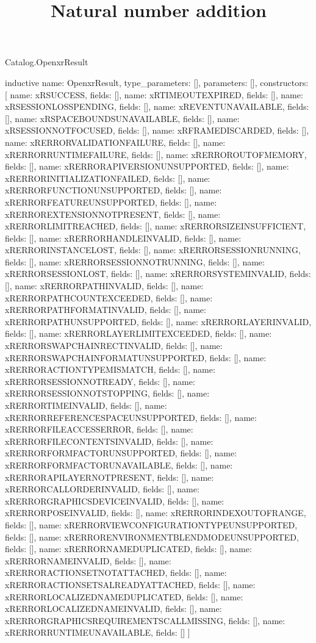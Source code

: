\begin{lexlean}{Catalog.OpenxrResult}
\title{Natural number addition}
\begin{semanticmodule}
inductive{
  name: OpenxrResult,
  type_parameters: [],
  parameters: [],
  constructors: [
    {name: xRSUCCESS, fields: []},
    {name: xRTIMEOUTEXPIRED, fields: []},
    {name: xRSESSIONLOSSPENDING, fields: []},
    {name: xREVENTUNAVAILABLE, fields: []},
    {name: xRSPACEBOUNDSUNAVAILABLE, fields: []},
    {name: xRSESSIONNOTFOCUSED, fields: []},
    {name: xRFRAMEDISCARDED, fields: []},
    {name: xRERRORVALIDATIONFAILURE, fields: []},
    {name: xRERRORRUNTIMEFAILURE, fields: []},
    {name: xRERROROUTOFMEMORY, fields: []},
    {name: xRERRORAPIVERSIONUNSUPPORTED, fields: []},
    {name: xRERRORINITIALIZATIONFAILED, fields: []},
    {name: xRERRORFUNCTIONUNSUPPORTED, fields: []},
    {name: xRERRORFEATUREUNSUPPORTED, fields: []},
    {name: xRERROREXTENSIONNOTPRESENT, fields: []},
    {name: xRERRORLIMITREACHED, fields: []},
    {name: xRERRORSIZEINSUFFICIENT, fields: []},
    {name: xRERRORHANDLEINVALID, fields: []},
    {name: xRERRORINSTANCELOST, fields: []},
    {name: xRERRORSESSIONRUNNING, fields: []},
    {name: xRERRORSESSIONNOTRUNNING, fields: []},
    {name: xRERRORSESSIONLOST, fields: []},
    {name: xRERRORSYSTEMINVALID, fields: []},
    {name: xRERRORPATHINVALID, fields: []},
    {name: xRERRORPATHCOUNTEXCEEDED, fields: []},
    {name: xRERRORPATHFORMATINVALID, fields: []},
    {name: xRERRORPATHUNSUPPORTED, fields: []},
    {name: xRERRORLAYERINVALID, fields: []},
    {name: xRERRORLAYERLIMITEXCEEDED, fields: []},
    {name: xRERRORSWAPCHAINRECTINVALID, fields: []},
    {name: xRERRORSWAPCHAINFORMATUNSUPPORTED, fields: []},
    {name: xRERRORACTIONTYPEMISMATCH, fields: []},
    {name: xRERRORSESSIONNOTREADY, fields: []},
    {name: xRERRORSESSIONNOTSTOPPING, fields: []},
    {name: xRERRORTIMEINVALID, fields: []},
    {name: xRERRORREFERENCESPACEUNSUPPORTED, fields: []},
    {name: xRERRORFILEACCESSERROR, fields: []},
    {name: xRERRORFILECONTENTSINVALID, fields: []},
    {name: xRERRORFORMFACTORUNSUPPORTED, fields: []},
    {name: xRERRORFORMFACTORUNAVAILABLE, fields: []},
    {name: xRERRORAPILAYERNOTPRESENT, fields: []},
    {name: xRERRORCALLORDERINVALID, fields: []},
    {name: xRERRORGRAPHICSDEVICEINVALID, fields: []},
    {name: xRERRORPOSEINVALID, fields: []},
    {name: xRERRORINDEXOUTOFRANGE, fields: []},
    {name: xRERRORVIEWCONFIGURATIONTYPEUNSUPPORTED, fields: []},
    {name: xRERRORENVIRONMENTBLENDMODEUNSUPPORTED, fields: []},
    {name: xRERRORNAMEDUPLICATED, fields: []},
    {name: xRERRORNAMEINVALID, fields: []},
    {name: xRERRORACTIONSETNOTATTACHED, fields: []},
    {name: xRERRORACTIONSETSALREADYATTACHED, fields: []},
    {name: xRERRORLOCALIZEDNAMEDUPLICATED, fields: []},
    {name: xRERRORLOCALIZEDNAMEINVALID, fields: []},
    {name: xRERRORGRAPHICSREQUIREMENTSCALLMISSING, fields: []},
    {name: xRERRORRUNTIMEUNAVAILABLE, fields: []}
  ]
}
\end{semanticmodule}
\end{lexlean}
